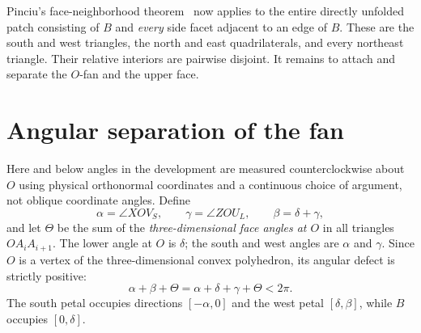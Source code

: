 \documentclass[a4paper,11pt]{amsart}
\begin{document}
Pinciu's face-neighborhood theorem~\cite[Theorem~1]{Pinciu2007} now applies to the entire directly unfolded patch consisting of $B$ and \emph{every} side facet adjacent to an edge of $B$. These are the south and west triangles, the north and east quadrilaterals, and every northeast triangle. Their relative interiors are pairwise disjoint. It remains to attach and separate the $O$-fan and the upper face.

\section{Angular separation of the fan}
Here and below angles in the development are measured counterclockwise about $O$ using physical orthonormal coordinates and a continuous choice of argument, not oblique coordinate angles. Define
\[
 \alpha=\angle XOV_S,\qquad
 \gamma=\angle ZOU_L,\qquad
 \beta=\delta+\gamma,
\]
and let $\Theta$ be the sum of the \emph{three-dimensional face angles at $O$} in all triangles $OA_iA_{i+1}$. The lower angle at $O$ is $\delta$; the south and west angles are $\alpha$ and $\gamma$. Since $O$ is a vertex of the three-dimensional convex polyhedron, its angular defect is strictly positive:
\begin{equation}\label{eq:curvature}
 \alpha+\beta+\Theta=\alpha+\delta+\gamma+\Theta<2\pi.
\end{equation}
The south petal occupies directions $[-\alpha,0]$ and the west petal $[\delta,\beta]$, while $B$ occupies $[0,\delta]$.
\end{document}

